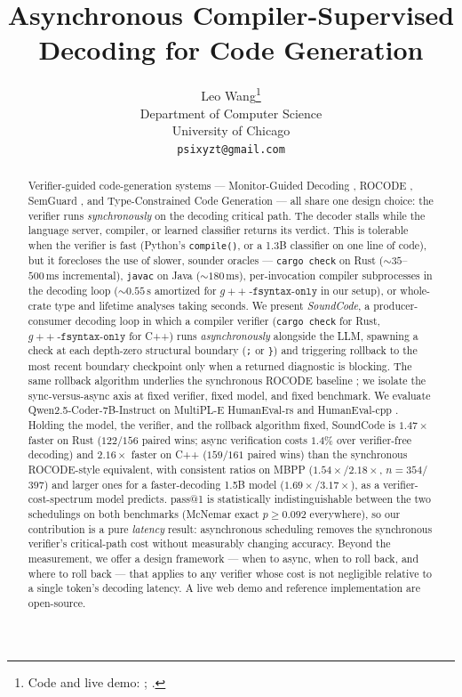 \documentclass{article}
\title{Asynchronous Compiler-Supervised Decoding for Code Generation}
\author{%
  Leo Wang\thanks{Code and live demo:
    \href{https://github.com/leobwang/soundcode}{\code{github.com/leobwang/soundcode}};
    \href{https://soundcode-demo.psixyzt.com}{\code{soundcode-demo.psixyzt.com}}.}\\
  Department of Computer Science\\
  University of Chicago\\
  \texttt{psixyzt@gmail.com}\\
}
\newcommand{\code}[1]{\texttt{#1}}
\begin{document}
\maketitle

\begin{abstract}
Verifier-guided code-generation systems --- Monitor-Guided Decoding
\citep{agrawal2023monitor}, ROCODE \citep{jiang2024rocode}, SemGuard
\citep{wang2025semguard}, and Type-Constrained Code Generation
\citep{mundler2025typeconstrained} --- all share one design choice:
the verifier runs \emph{synchronously} on the decoding critical path.
The decoder stalls while the language server, compiler, or learned
classifier returns its verdict. This is tolerable when the verifier
is fast (Python's \code{compile()}, or a 1.3B classifier on one
line of code), but it forecloses the
use of slower, sounder oracles --- \code{cargo check} on Rust
(${\sim}35$--$500\,\mathrm{ms}$ incremental), \code{javac} on Java
(${\sim}180\,\mathrm{ms}$), per-invocation compiler subprocesses in
the decoding loop (${\sim}0.55\,\mathrm{s}$ amortized for
$g{+}{+}\;\code{-fsyntax-only}$ in our setup), or whole-crate type
and lifetime analyses taking seconds.
We present \emph{SoundCode}, a producer-consumer decoding loop in
which a compiler verifier (\code{cargo check} for Rust,
$g{+}{+}\;\code{-fsyntax-only}$ for C++) runs
\emph{asynchronously} alongside the LLM, spawning a check at each
depth-zero structural boundary (\code{;} or \code{\}}) and triggering
rollback to the most recent boundary checkpoint only when a returned
diagnostic is blocking. The same rollback algorithm underlies the
synchronous ROCODE baseline \citep{jiang2024rocode}; we isolate the
sync-versus-async axis at fixed verifier, fixed model, and fixed
benchmark.
We evaluate Qwen2.5-Coder-7B-Instruct \citep{hui2024qwen25coder}
on MultiPL-E HumanEval-rs and HumanEval-cpp
\citep{cassano2022multipl}. Holding the model, the verifier, and the
rollback algorithm fixed, SoundCode is $1.47\times$ faster on Rust
($122/156$ paired wins; async verification costs $1.4\%$ over
verifier-free decoding) and $2.16\times$ faster on C++
($159/161$ paired wins) than the synchronous ROCODE-style
equivalent, with consistent ratios on MBPP
($1.54\times$/$2.18\times$, $n\!=\!354$/$397$) and larger ones for
a faster-decoding 1.5B model ($1.69\times$/$3.17\times$), as a
verifier-cost-spectrum model predicts.
pass@1 is statistically indistinguishable between the
two schedulings on both benchmarks (McNemar exact $p\!\geq\!0.092$
everywhere), so our contribution is a pure
\emph{latency} result: asynchronous scheduling removes the
synchronous verifier's critical-path cost without measurably
changing accuracy.
Beyond the measurement, we offer a design framework
--- when to async, when to roll back, and where to roll back --- that
applies to any verifier whose cost is not negligible relative to a
single token's decoding latency. A live web demo and reference
implementation are open-source.
\end{abstract}









\end{document}
